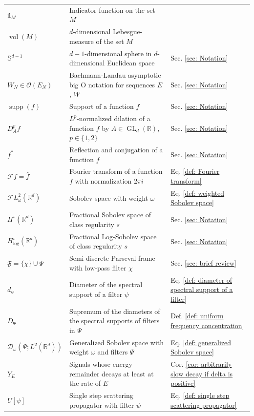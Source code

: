 \documentclass[11pt]{amsart}
\newcommand{\R}{{\mathbb{R}}}
\DeclareMathOperator{\GL}{GL}
\DeclareMathOperator{\supp}{supp}
\DeclareMathOperator{\vol}{vol}
\newenvironment{proof sketch} {\textit{Proof sketch.}}{}
\begin{document}
\begin{table}[h!]
{\begin{tabular}{@{}lll@{}}
  			$\mathds{1}_M$ & Indicator function on the set $M$ & \\
  			$\vol(M)$ & $d$-dimensional Lebesgue-measure of the set $M$ & \\
  			$\mathbb{S}^{d-1}$ & $d-1$-dimensional sphere in $d$-dimensional Euclidean space & Sec. \ref{sec: Notation} \\
  			$W_N \in \mathcal{O}(E_N)$ & Bachmann-Landau asymptotic big O notation for sequences $E$, $W$ & Sec. \ref{sec: Notation}\\
  			$\supp(f)$ & Support of a function $f$ & Sec. \ref{sec: Notation}\\
  			$D_A^pf$ & $L^p$-normalized dilation of a function $f$ by $A\in \GL_d(\R)$, $p \in \{1,2\}$ & Sec. \ref{sec: Notation} \\
  			$f^*$ & Reflection and conjugation of a function $f$ & Sec. \ref{sec: Notation}\\
  			$\mathcal{F}f=\widehat{f}$ & Fourier transform of a function $f$ with normalization $2\pi i$ & Eq. \eqref{def: Fourier transform} \\
  			$\mathcal{F}L_\omega^2(\R^d)$ & Sobolev space with weight $\omega$ & Eq. \eqref{def: weighted Sobolev space} \\
  			$H^s(\R^d)$ & Fractional Sobolev space of class regularity $s$ & Sec. \ref{sec: Notation} \\
  			$H^s_{\log}(\R^d)$ & Fractional Log-Sobolev space of class regularity $s$ & Sec. \ref{sec: Notation} \\
  			$\mathfrak{F}=\{\chi\} \cup \Psi$ & Semi-discrete Parseval frame with low-pass filter $\chi$ & Sec. \ref{sec: brief review} \\
  			$d_\psi$ & Diameter of the spectral support of a filter $\psi$ & Eq. \eqref{def: diameter of spectral support of a filter}\\
  			$D_\Psi$ & Supremum of the diameters of the spectral supports of filters in $\Psi$ & Def. \ref{def: uniform frequency concentration}\\
  			$\mathcal{D}_\omega(\Psi;L^2(\R^d))$ & Generalized Sobolev space with weight $\omega$ and filters $\Psi$ & Eq. \eqref{def: generalized Sobolev space} \\
  			$Y_E$ & Signals whose energy remainder decays at least at the rate of $E$ & Cor. \ref{cor: arbitrarily slow decay if delta is positive} \\
  			$U[\psi]$ & Single step scattering propagator with filter $\psi$ & Eq. \eqref{def: single step scattering propagator} \\

\end{tabular}}
\end{table}
\end{document}
